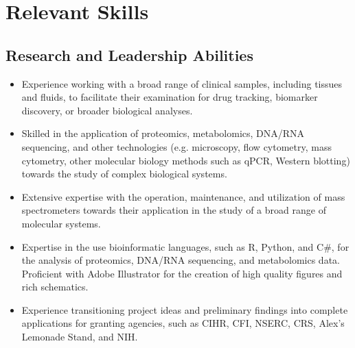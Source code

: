 \documentclass[11pt]{article}
\begin{document}
\section*{Relevant Skills}
\begin{addmargin}[3em]{2em}%
	\subsection*{Research and Leadership Abilities}
	\begin{itemize}
        \item Experience working with a broad range of clinical samples, including tissues and fluids, to facilitate their examination for drug tracking, biomarker discovery, or broader biological analyses. 
        \item Skilled in the application of proteomics, metabolomics, DNA/RNA sequencing, and other technologies (e.g. microscopy, flow cytometry, mass cytometry, other molecular biology methods such as qPCR, Western blotting) towards the study of complex biological systems.
        \item Extensive expertise with the operation, maintenance, and utilization of mass spectrometers towards their application in the study of a broad range of molecular systems. 
        \item Expertise in the use bioinformatic languages, such as R, Python, and C\#, for the analysis of proteomics, DNA/RNA sequencing, and metabolomics data. Proficient with Adobe Illustrator for the creation of high quality figures and rich schematics.
        \item Experience transitioning project ideas and preliminary findings into complete applications for granting agencies, such as CIHR, CFI, NSERC, CRS, Alex's Lemonade Stand, and NIH.		

\end{itemize}
\end{addmargin}
\end{document}
